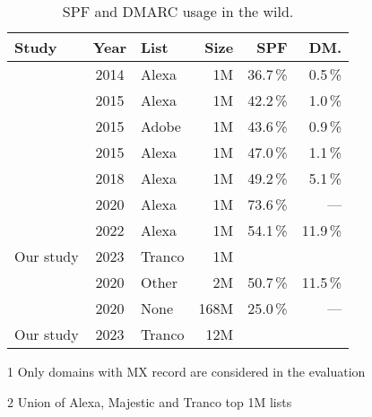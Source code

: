 \begin{table}[tbp]
\begin{threeparttable}
	\centering \small
	\caption{SPF and DMARC usage in the wild.}
	\label{tab:usage}
	\begin{tabular}{lclrrr}
		\toprule
		\textbf{Study}            & \textbf{Year} & \textbf{List} & \textbf{Size} & \textbf{SPF}     & \textbf{DM.}           \\
		\midrule
        \citet{Gojmerac2015}    & 2014          & Alexa         & 1M               & 36.7\,\%        & 0.5\,\%             \\
		\citet{Foster_2015}     & 2015          & Alexa         & 1M               & 42.2\,\%        & 1.0\,\%             \\
		\citet{Foster_2015}     & 2015          & Adobe         & 1M               & 43.6\,\%        & 0.9\,\%             \\
		\citet{Durumeric_2015}\tnote{1}  & 2015          & Alexa         & 1M               & 47.0\,\%           & 1.1\,\%              \\
        \citet{HuWan18}          & 2018          & Alexa         & 1M               & 49.2\,\%         & 5.1\,\%              \\
        \citet{Kahraman2020}    & 2020          & Alexa          & 1M & 73.6\,\% & --- \\
        \citet{Wang2022} & 2022 & Alexa & 1M & 54.1\,\% & 11.9\,\% \\
		Our study                     & 2023          & Tranco        & 1M               & \SPFDomainsMPerc & \DMARCAllDomainsMPerc \\
        \midrule
        \citet{Tatang2021}      & 2020          & Other\tnote{2} & 2M & 50.7\,\%  & 11.5\,\% \\
        \citet{Kahraman2020}    & 2020          & None          & 168M & 25.0\,\% & --- \\
		Our study                     & 2023          & Tranco        & 12M              & \SPFDomainsPerc  & \DMARCAllDomainsPerc  \\
		\bottomrule
	\end{tabular}
    \begin{tablenotes}
        \item[1] Only domains with MX record are considered in the evaluation
        \item[2] Union of Alexa, Majestic and Tranco top 1M lists
    \end{tablenotes}
 \end{threeparttable}
\end{table}



